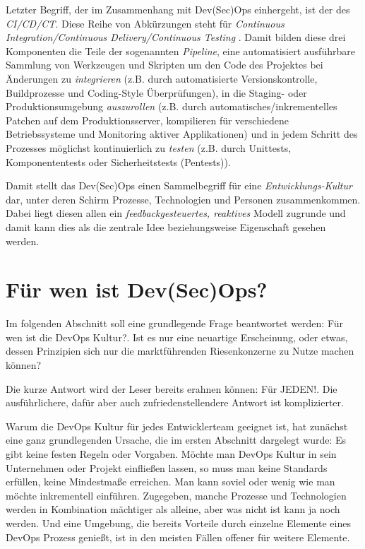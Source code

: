 Letzter Begriff, der im Zusammenhang mit Dev(Sec)Ops einhergeht, ist der des \emph{CI/CD/CT}. Diese Reihe von Abkürzungen steht für \emph{Continuous Integration/Continuous Delivery/Continuous Testing} \cite{kinsbrunerHowMakeCI2018}. Damit bilden diese drei Komponenten die Teile der sogenannten \emph{Pipeline}, eine automatisiert ausführbare Sammlung von Werkzeugen und Skripten um den Code des Projektes bei Änderungen zu \emph{integrieren} (z.B. durch automatisierte Versionskontrolle, Buildprozesse und Coding-Style Überprüfungen), in die Staging- oder Produktionsumgebung \emph{auszurollen} (z.B. durch automatisches/inkrementelles Patchen auf dem Produktionsserver, kompilieren für verschiedene Betriebssysteme und Monitoring aktiver Applikationen) und in jedem Schritt des Prozesses möglichst kontinuierlich zu \emph{testen} (z.B. durch Unittests, Komponententests oder Sicherheitstests (Pentests)). 

Damit stellt das Dev(Sec)Ops einen Sammelbegriff für eine \emph{Entwicklungs-Kultur} \cite{kolblSoftwareentwicklungMitDev2021} dar, unter deren Schirm Prozesse, Technologien und Personen zusammenkommen. Dabei liegt diesen allen ein \emph{feedbackgesteuertes, reaktives} Modell zugrunde und damit kann dies als die zentrale Idee beziehungsweise Eigenschaft gesehen werden.

\section{Für wen ist Dev(Sec)Ops?}

Im folgenden Abschnitt soll eine grundlegende Frage beantwortet werden: \glqq Für wen ist die DevOps Kultur?\grqq{}. 
Ist es nur eine neuartige Erscheinung, oder etwas, dessen Prinzipien sich nur die marktführenden Riesenkonzerne zu Nutze machen können?

Die kurze Antwort wird der Leser bereits erahnen können: \glqq Für JEDEN!\grqq{}. Die ausführlichere, dafür aber auch zufriedenstellendere Antwort ist komplizierter. 

Warum die DevOps Kultur für jedes Entwicklerteam geeignet ist, hat zunächst eine ganz grundlegenden Ursache, die im ersten Abschnitt dargelegt wurde: Es gibt keine festen Regeln oder Vorgaben. Möchte man DevOps Kultur in sein Unternehmen oder Projekt einfließen lassen, so muss man keine Standards erfüllen, keine Mindestmaße erreichen. 
Man kann soviel oder wenig wie man möchte inkrementell einführen.
Zugegeben, manche Prozesse und Technologien werden in Kombination mächtiger als alleine, aber was nicht ist kann ja noch werden.
Und eine Umgebung, die bereits Vorteile durch einzelne Elemente eines DevOps Prozess genießt, ist in den meisten Fällen offener für weitere Elemente. 

